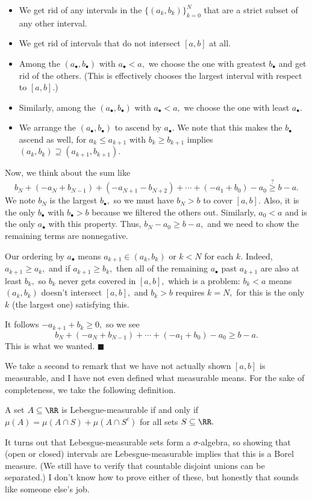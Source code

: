 \begin{itemize}
    \item We get rid of any intervals in the $\{(a_k,b_k)\}_{k=0}^N$ that are a strict subset of any other interval.
    \item We get rid of intervals that do not intersect $[a,b]$ at all.
    \item Among the $(a_\bullet,b_\bullet)$ with $a_\bullet<a,$ we choose the one with greatest $b_\bullet$ and get rid of the others. (This is effectively chooses the largest interval with respect to $[a,b].$)
    \item Similarly, among the $(a_\bullet,b_\bullet)$ with $a_\bullet<a,$ we choose the one with least $a_\bullet.$
    \item We arrange the $(a_\bullet,b_\bullet)$ to ascend by $a_\bullet.$ We note that this makes the $b_\bullet$ ascend as well, for $a_k\le a_{k+1}$ with $b_k\ge b_{k+1}$ implies $(a_k,b_k)\supseteq(a_{k+1},b_{k+1}).$
\end{itemize}
Now, we think about the sum like
\[b_N+(-a_N+b_{N-1})+(-a_{N+1}-b_{N+2})+\cdots+(-a_1+b_0)-a_0\stackrel?\ge b-a.\]
We note $b_N$ is the largest $b_\bullet,$ so we must have $b_N>b$ to cover $[a,b].$ Also, it is the only $b_\bullet$ with $b_\bullet>b$ because we filtered the others out. Similarly, $a_0<a$ and is the only $a_\bullet$ with this property. Thus, $b_N-a_0\ge b-a,$ and we need to show the remaining terms are nonnegative.

Our ordering by $a_\bullet$ means $a_{k+1}\in(a_k,b_k)$ or $k<N$ for each $k.$ Indeed, $a_{k+1}\ge a_k,$ and if $a_{k+1}\ge b_k,$ then all of the remaining $a_\bullet$ past $a_{k+1}$ are also at least $b_k,$ so $b_k$ never gets covered in $[a,b],$ which is a problem: $b_k<a$ means $(a_k,b_k)$ doesn't intersect $[a,b],$ and $b_k>b$ requires $k=N,$ for this is the only $k$ (the largest one) satisfying this.

It follows $-a_{k+1}+b_k\ge0,$ so we see
\[b_N+(-a_N+b_{N-1})+\cdots+(-a_1+b_0)-a_0\ge b-a.\]
This is what we wanted. $\blacksquare$

We take a second to remark that we have not actually shown $[a,b]$ is measurable, and I have not even defined what measurable means. For the sake of completeness, we take the following definition.
\begin{definition}
    A set $A\subseteq\RR$ is Lebesgue-measurable if and only if $\mu(A)=\mu(A\cap S)+\mu(A\cap S^c)$ for all sets $S\subseteq\RR.$
\end{definition}
It turns out that Lebesgue-measurable sets form a $\sigma$-algebra, so showing that (open or closed) intervals are Lebesgue-measurable implies that this is a Borel measure. (We still have to verify that countable disjoint unions can be separated.) I don't know how to prove either of these, but honestly that sounds like someone else's job.

